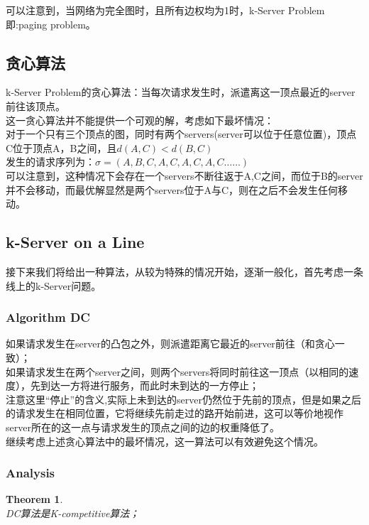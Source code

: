 \documentclass[11pt]{ctexart}
\newtheorem{theorem}{Theorem}
\begin{document}
可以注意到，当网络为完全图时，且所有边权均为1时，k-Server Problem即:paging problem。

\subsection{贪心算法}

k-Server Problem的贪心算法：当每次请求发生时，派遣离这一顶点最近的server前往该顶点。\\

这一贪心算法并不能提供一个可观的解，考虑如下最坏情况：\\

对于一个只有三个顶点的图，同时有两个servers(server可以位于任意位置)，顶点C位于顶点A，B之间，且$d(A,C)<d(B,C)$\\

发生的请求序列为：$\sigma=(A,B,C,A,C,A,C,A,C……)$\\

可以注意到，这种情况下会存在一个servers不断往返于A,C之间，而位于B的server并不会移动，而最优解显然是两个servers位于A与C，则在之后不会发生任何移动。



\subsection{k-Server on a Line}
接下来我们将给出一种算法，从较为特殊的情况开始，逐渐一般化，首先考虑一条线上的k-Server问题。

\subsubsection{Algorithm DC}
如果请求发生在server的凸包之外，则派遣距离它最近的server前往（和贪心一致）；\\

如果请求发生在两个server之间，则两个servers将同时前往这一顶点（以相同的速度），先到达一方将进行服务，而此时未到达的一方停止；\\

注意这里“停止”的含义,实际上未到达的server仍然位于先前的顶点，但是如果之后的请求发生在相同位置，它将继续先前走过的路开始前进，这可以等价地视作server所在的这一点与请求发生的顶点之间的边的权重降低了。\\

继续考虑上述贪心算法中的最坏情况，这一算法可以有效避免这个情况。

\subsubsection{Analysis}
\begin{theorem}\\
DC算法是K-competitive算法；
\end{theorem}
\end{document}
